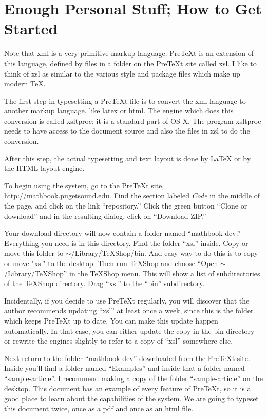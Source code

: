 \documentclass[11pt, oneside]{article}   	%
\begin{document}
\section{Enough Personal Stuff; How to Get Started}

Note that xml is a very primitive markup language. PreTeXt is an extension of this language, defined by files in
a folder on the PreTeXt site called xsl. I like to think of xsl as similar to the various style and package files which make up modern TeX. 

The first step in typesetting a PreTeXt file is to convert the xml language to another markup language, like latex or html. The engine which does this conversion is called xsltproc; it is a standard part of OS X. The program xsltproc needs to have access to the document source and also the files in xsl to do the conversion.

After this step, the actual typesetting and text layout is done by LaTeX or by the HTML layout engine.

To begin using the system, go to the PreTeXt site, \url{http://mathbook.pugetsound.edu}. Find the section labeled {\em Code} in the middle of the page, and click on the link ``repository.'' Click the green button ``Clone or download'' and in the resulting dialog, click on ``Download ZIP.''

Your download directory will now contain a folder named ``mathbook-dev.'' Everything you need is in this directory. Find the folder ``xsl'' inside.  Copy or move this folder to
$\sim$/Library/TeXShop/bin. And easy way to do this is to copy or move "xsl" to the desktop. Then run TeXShop
and choose ``Open $\sim$/Library/TeXShop'' in the TeXShop menu. This will show a list of subdirectories of the TeXShop directory. Drag ``xsl'' to the ``bin'' subdirectory.

Incidentally, if you decide to use PreTeXt regularly, you will discover that the author recommends updating ``xsl'' at least once a week, since this is the folder which keeps PreTeXt up to date. You can make this update happen automatically. In that case, you can either update the copy in the bin directory or rewrite the engines slightly to refer to a copy of ``xsl'' somewhere else.

Next return to  the folder ``mathbook-dev'' downloaded from the PreTeXt site. Inside you'll find a folder named ``Examples'' and inside that a folder named ``sample-article''. I recommend making a copy of the folder ``sample-article'' on the desktop. This document has an example of every feature of PreTeXt, so it is a good place to learn about the capabilities of the system. We are going to typeset this document twice, once as a pdf and once as an html file. 
\end{document}
